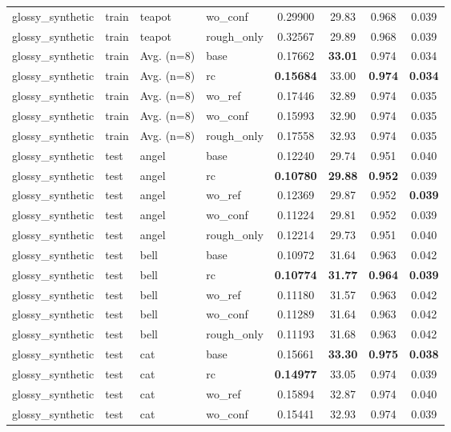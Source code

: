 \begin{table}[t]
{\begin{tabular}{llllcccc}
glossy\_synthetic & train & teapot & wo\_conf & 0.29900 & 29.83 & 0.968 & 0.039 \\
glossy\_synthetic & train & teapot & rough\_only & 0.32567 & 29.89 & 0.968 & 0.039 \\
glossy\_synthetic & train & Avg. (n=8) & base & 0.17662 & \textbf{33.01} & 0.974 & 0.034 \\
glossy\_synthetic & train & Avg. (n=8) & rc & \textbf{0.15684} & 33.00 & \textbf{0.974} & \textbf{0.034} \\
glossy\_synthetic & train & Avg. (n=8) & wo\_ref & 0.17446 & 32.89 & 0.974 & 0.035 \\
glossy\_synthetic & train & Avg. (n=8) & wo\_conf & 0.15993 & 32.90 & 0.974 & 0.035 \\
glossy\_synthetic & train & Avg. (n=8) & rough\_only & 0.17558 & 32.93 & 0.974 & 0.035 \\
\midrule
glossy\_synthetic & test & angel & base & 0.12240 & 29.74 & 0.951 & 0.040 \\
glossy\_synthetic & test & angel & rc & \textbf{0.10780} & \textbf{29.88} & \textbf{0.952} & 0.039 \\
glossy\_synthetic & test & angel & wo\_ref & 0.12369 & 29.87 & 0.952 & \textbf{0.039} \\
glossy\_synthetic & test & angel & wo\_conf & 0.11224 & 29.81 & 0.952 & 0.039 \\
glossy\_synthetic & test & angel & rough\_only & 0.12214 & 29.73 & 0.951 & 0.040 \\
glossy\_synthetic & test & bell & base & 0.10972 & 31.64 & 0.963 & 0.042 \\
glossy\_synthetic & test & bell & rc & \textbf{0.10774} & \textbf{31.77} & \textbf{0.964} & \textbf{0.039} \\
glossy\_synthetic & test & bell & wo\_ref & 0.11180 & 31.57 & 0.963 & 0.042 \\
glossy\_synthetic & test & bell & wo\_conf & 0.11289 & 31.64 & 0.963 & 0.042 \\
glossy\_synthetic & test & bell & rough\_only & 0.11193 & 31.68 & 0.963 & 0.042 \\
glossy\_synthetic & test & cat & base & 0.15661 & \textbf{33.30} & \textbf{0.975} & \textbf{0.038} \\
glossy\_synthetic & test & cat & rc & \textbf{0.14977} & 33.05 & 0.974 & 0.039 \\
glossy\_synthetic & test & cat & wo\_ref & 0.15894 & 32.87 & 0.974 & 0.040 \\
glossy\_synthetic & test & cat & wo\_conf & 0.15441 & 32.93 & 0.974 & 0.039 \\

\end{tabular}}
\end{table}
